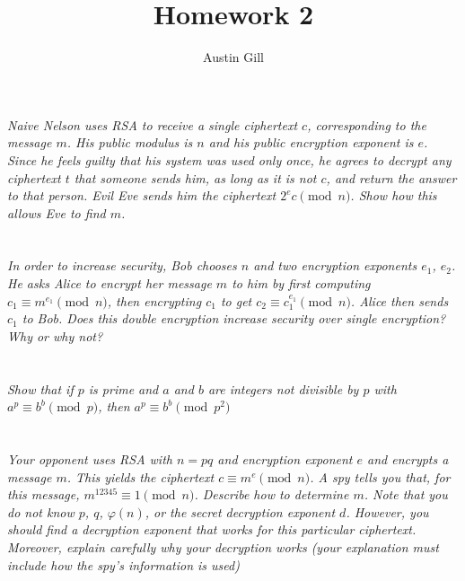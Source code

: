 \documentclass[12pt]{article}
\title{Homework 2}
\author{Austin Gill}
\begin{document}
\maketitle

\section{} \textit{Naive Nelson uses RSA to receive a single ciphertext $c$, corresponding to the message $m$. His public modulus is $n$ and his public encryption exponent is $e$. Since he feels guilty that his system was used only once, he agrees to decrypt any ciphertext $t$ that someone sends him, as long as it is not $c$, and return the answer to that person.  Evil Eve sends him the ciphertext ${2^e}c \pmod{n}$. Show how this allows Eve to find $m$.}

\section{} \textit{In order to increase security, Bob chooses $n$ and two encryption exponents $e_1$, $e_2$. He asks Alice to encrypt her message $m$ to him by first computing $c_1 \equiv m^{e_1} \pmod{n}$, then encrypting $c_1$ to get $c_2 \equiv c_1^{e_1} \pmod{n}$. Alice  then sends $c_1$ to Bob.  Does this double encryption increase security over single encryption?  Why or why not?}

\section{} \textit{Show that if $p$ is prime and $a$ and $b$ are integers not divisible by $p$ with $a^p \equiv b^b \pmod{p}$, then $a^p \equiv b^b \pmod{p^2}$}

\section{} \textit{Your opponent uses RSA with $n = pq$ and encryption exponent $e$ and encrypts a message $m$. This yields the ciphertext $c \equiv m^e \pmod{n}$. A spy tells you that, for this message, $m^{12345} \equiv 1 \pmod{n}$. Describe how to determine $m$. Note that you do not know $p$, $q$, $\varphi(n)$, or the secret decryption exponent $d$. However, you should find a decryption exponent that works for this particular ciphertext. Moreover, explain carefully why your decryption works (your explanation must include how the spy’s information is used)}

\section{}
\end{document}
